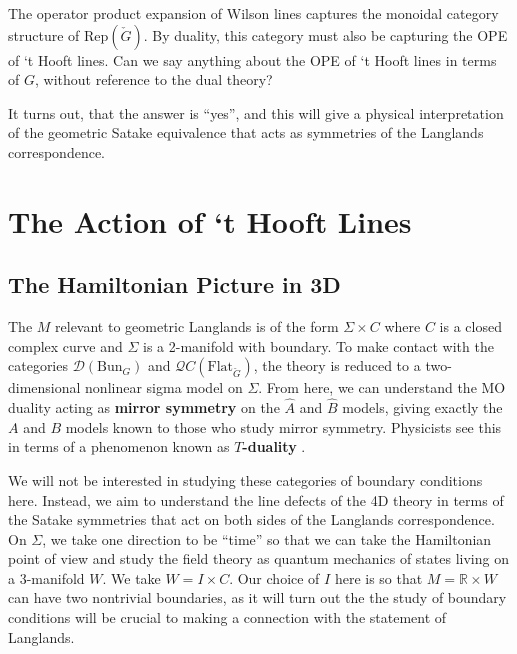 		The operator product expansion of Wilson lines captures the monoidal category structure of $\mathrm{Rep}(\check G)$. By duality, this category must also be capturing the OPE of `t Hooft lines. Can we say anything about the OPE of `t Hooft lines in terms of $G$, without reference to the dual theory?
		
		It turns out, that the answer is ``yes'', and this will give a physical interpretation of the geometric Satake equivalence that acts as symmetries of the Langlands correspondence.



	\section{The Action of `t Hooft Lines} %
	\label{sec:the_action_of_t_hooft_lines}
	
	\subsection{The Hamiltonian Picture in 3D} %
	\label{sub:the_hamiltonian_picture_in_3d}
	
	The $M$ relevant to geometric Langlands is of the form  $\Sigma \times C$ where $C$ is a closed complex curve and $\Sigma$ is a 2-manifold with boundary. To make contact with the categories $\mathcal D(\mathrm{Bun}_G)$ and $\mathcal QC(\mathrm{Flat}_{\check G})$, the theory is reduced to a two-dimensional nonlinear sigma model on $\Sigma$. From here, we can understand the MO duality acting as \textbf{mirror symmetry} on the $\hat A$ and $\hat B$ models, giving exactly the $A$ and $B$ models known to those who study mirror symmetry. Physicists see this in terms of a phenomenon known as \textbf{$T$-duality} \cite{strominger1996}. 
	
	We will not be interested in studying these categories of boundary conditions here. Instead, we aim to understand the line defects of the 4D theory in terms of the Satake symmetries that act on both sides of the Langlands correspondence. On $\Sigma$, we take one direction to be ``time'' so that we can take the Hamiltonian point of view and study the field theory as quantum mechanics of states living on a 3-manifold $W$. We take $W = I \times C$. Our choice of $I$ here is so that $M = \mathbb R \times W$ can have two nontrivial boundaries, as it will turn out the the study of boundary conditions will be crucial to making a connection with the statement of Langlands.
	
